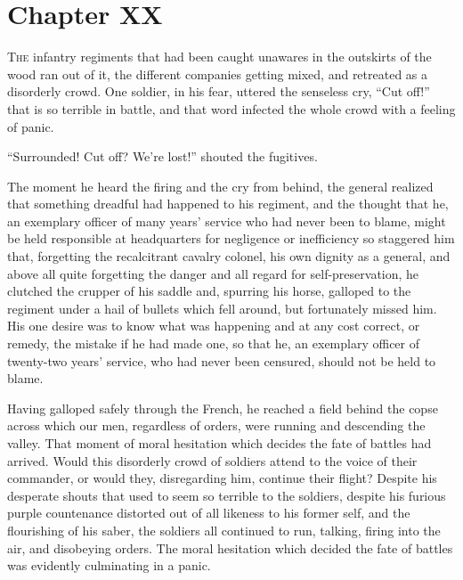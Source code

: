 \chapter*{Chapter XX}
\ifaudio     {} \fi

\lettrine[lines=2, loversize=0.3, lraise=0]{\initfamily T}{he}
infantry regiments that had been caught unawares in the
outskirts of the wood ran out of it, the different companies
getting mixed, and retreated as a disorderly crowd. One soldier,
in his fear, uttered the senseless cry, ``Cut off!'' that is so
terrible in battle, and that word infected the whole crowd with a
feeling of panic.

``Surrounded! Cut off? We're lost!'' shouted the fugitives.

The moment he heard the firing and the cry from behind, the
general realized that something dreadful had happened to his
regiment, and the thought that he, an exemplary officer of many
years' service who had never been to blame, might be held
responsible at headquarters for negligence or inefficiency so
staggered him that, forgetting the recalcitrant cavalry colonel,
his own dignity as a general, and above all quite forgetting the
danger and all regard for self-preservation, he clutched the
crupper of his saddle and, spurring his horse, galloped to the
regiment under a hail of bullets which fell around, but
fortunately missed him. His one desire was to know what was
happening and at any cost correct, or remedy, the mistake if he
had made one, so that he, an exemplary officer of twenty-two
years' service, who had never been censured, should not be held
to blame.

Having galloped safely through the French, he reached a field
behind the copse across which our men, regardless of orders, were
running and descending the valley. That moment of moral
hesitation which decides the fate of battles had arrived. Would
this disorderly crowd of soldiers attend to the voice of their
commander, or would they, disregarding him, continue their
flight? Despite his desperate shouts that used to seem so
terrible to the soldiers, despite his furious purple countenance
distorted out of all likeness to his former self, and the
flourishing of his saber, the soldiers all continued to run,
talking, firing into the air, and disobeying orders. The moral
hesitation which decided the fate of battles was evidently
culminating in a panic.

